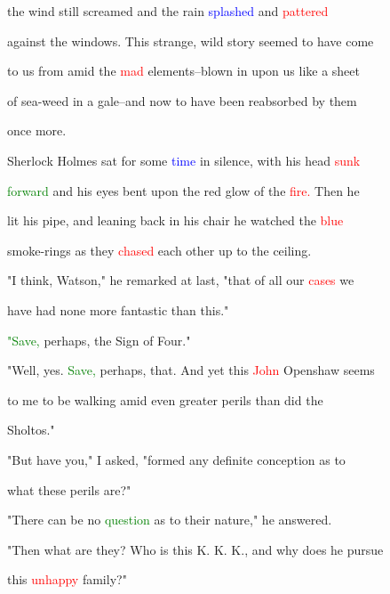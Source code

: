  the wind still \textcolor{BurntOrange}{screamed} and the rain \textcolor{blue}{splashed} and \textcolor{red}{pattered}

 against the windows. This strange, \textcolor{BurntOrange}{wild} story seemed to have come

 to us from amid the \textcolor{red}{mad} elements--blown in upon us like a sheet

 of sea-weed in a gale--and now to have been reabsorbed by them

 once more.



 Sherlock Holmes sat for some \textcolor{blue}{time} in silence, with his head \textcolor{red}{sunk}

 \textcolor{green}{forward} and his eyes bent upon the red \textcolor{BurntOrange}{glow} of the \textcolor{red}{fire.} Then he

 lit his pipe, and leaning back in his chair he \textcolor{BurntOrange}{watched} the \textcolor{red}{blue}

 smoke-rings as they \textcolor{red}{chased} each other up to the ceiling.



 "I think, Watson," he remarked at last, "that of all our \textcolor{red}{cases} we

 have had none more fantastic than this."



 \textcolor{green}{"Save,} perhaps, the Sign of Four."



 "Well, yes. \textcolor{green}{Save,} perhaps, that. And yet this \textcolor{red}{John} Openshaw seems

 to me to be walking amid even greater \textcolor{BurntOrange}{perils} than did the

 Sholtos."



 "But have you," I asked, "formed any definite conception as to

 what these \textcolor{BurntOrange}{perils} are?"



 "There can be no \textcolor{green}{question} as to their nature," he answered.



 "Then what are they? Who is this K. K. K., and why does he pursue

 this \textcolor{red}{unhappy} family?"



